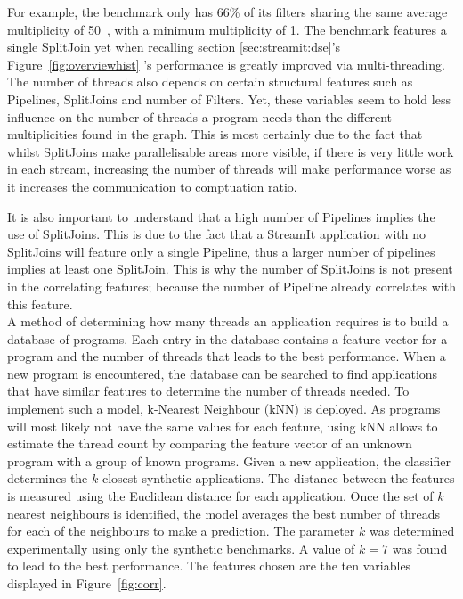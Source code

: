 For example, the benchmark  only has 66\% of its filters sharing the same average multiplicity of 50~\cite{thiesStreamit2010}, with a minimum multiplicity of 1. 
The benchmark features a single SplitJoin yet when recalling section \ref{sec:streamit:dse}'s Figure~\ref{fig:overviewhist} 's performance is greatly improved via multi-threading.
The number of threads also depends on certain structural features such as Pipelines, SplitJoins and number of Filters.
Yet, these variables seem to hold less influence on the number of threads a program needs than the different multiplicities found in the graph.
This is most certainly due to the fact that whilst SplitJoins make parallelisable areas more visible, if there is very little work in each stream, increasing the number of threads will make performance worse as it increases the communication to comptuation ratio.

It is also important to understand that a high number of Pipelines implies the use of SplitJoins.
This is due to the fact that a StreamIt application with no SplitJoins will feature only a single Pipeline, thus a larger number of pipelines implies at least one SplitJoin.
This is why the number of SplitJoins is not present in the correlating features; because the number of Pipeline already correlates with this feature.\\

A method of determining how many threads an application requires is to build a database of programs.
Each entry in the database contains a feature vector for a program and the number of threads that leads to the best performance.
When a new program is encountered, the database can be searched to find applications that have similar features to determine the number of threads needed.
To implement such a model, k-Nearest Neighbour (kNN) is deployed.
As programs will most likely not have the same values for each feature, using kNN allows to estimate the thread count by comparing the feature vector of an unknown program with a group of known programs.
Given a new application, the classifier determines the $k$ closest synthetic applications.
The distance between the features is measured using the Euclidean distance for each application.
Once the set of $k$ nearest neighbours is identified, the model averages the best number of threads for each of the neighbours to make a prediction. 
The parameter $k$ was determined experimentally using only the synthetic benchmarks.
A value of $k=7$ was found to lead to the best performance.
The features chosen are the ten variables displayed in Figure~\ref{fig:corr}.

